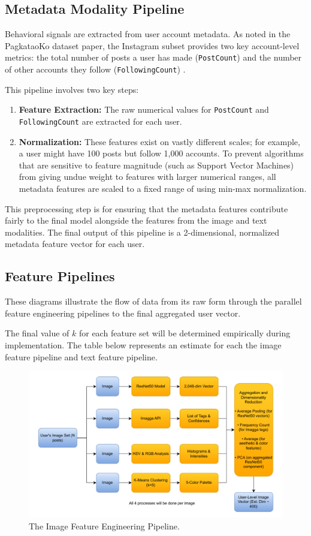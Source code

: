 \subsection{Metadata Modality Pipeline}
Behavioral signals are extracted from user account metadata. As noted in the PagkataoKo dataset paper, the Instagram subset provides two key account-level metrics: the total number of posts a user has made (\texttt{PostCount}) and the number of other accounts they follow (\texttt{FollowingCount}) \citep{tighe_acorda_2022}.

This pipeline involves two key steps:
\begin{enumerate}
	\item \textbf{Feature Extraction:} The raw numerical values for \texttt{PostCount} and \texttt{FollowingCount} are extracted for each user.
	\item \textbf{Normalization:} These features exist on vastly different scales; for example, a user might have 100 posts but follow 1,000 accounts. To prevent algorithms that are sensitive to feature magnitude (such as Support Vector Machines) from giving undue weight to features with larger numerical ranges, all metadata features are scaled to a fixed range of  using min-max normalization.
\end{enumerate}
This preprocessing step is for ensuring that the metadata features contribute fairly to the final model alongside the features from the image and text modalities. The final output of this pipeline is a 2-dimensional, normalized metadata feature vector for each user.

\subsection{Feature Pipelines}
These diagrams illustrate the flow of data from its raw form through the parallel feature engineering pipelines to the final aggregated user vector. 

The final value of $k$ for each feature set will be determined empirically during implementation. The table below represents an estimate for each the image feature pipeline and text feature pipeline.


\begin{figure}[H]
	\centering
	\includegraphics[width=\textwidth]{"figures/Image-Pipeline-Diagram.pdf"}
	\caption{The Image Feature Engineering Pipeline. }
	\label{fig:image_pipeline_diagram}
\end{figure}

